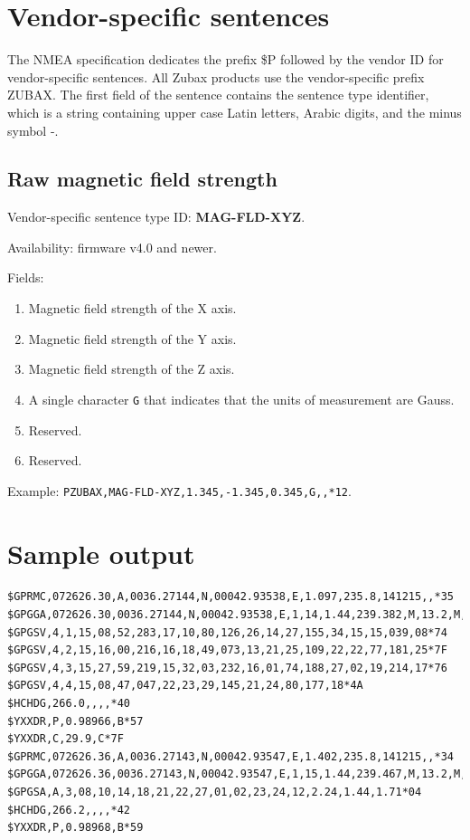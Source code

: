 \documentclass{zubaxdoc}
\begin{document}
\section{Vendor-specific sentences}

The NMEA specification dedicates the prefix {\$}P followed by the vendor ID for vendor-specific sentences. All Zubax products use the vendor-specific prefix ZUBAX. The first field of the sentence contains the sentence type identifier, which is a string containing upper case Latin letters, Arabic digits, and the minus symbol -.

\subsection{Raw magnetic field strength}

Vendor-specific sentence type ID: \textbf{MAG-FLD-XYZ}.

Availability: firmware v4.0 and newer.

Fields:

\begin{enumerate}
\item Magnetic field strength of the X axis.
\item Magnetic field strength of the Y axis.
\item Magnetic field strength of the Z axis.
\item A single character \texttt{G} that indicates that the units of measurement are Gauss.
\item Reserved.
\item Reserved.
\end{enumerate}

Example: \verb|PZUBAX,MAG-FLD-XYZ,1.345,-1.345,0.345,G,,*12|.

\section{Sample output}

\begin{verbatim}
$GPRMC,072626.30,A,0036.27144,N,00042.93538,E,1.097,235.8,141215,,*35
$GPGGA,072626.30,0036.27144,N,00042.93538,E,1,14,1.44,239.382,M,13.2,M,,*5E
$GPGSV,4,1,15,08,52,283,17,10,80,126,26,14,27,155,34,15,15,039,08*74
$GPGSV,4,2,15,16,00,216,16,18,49,073,13,21,25,109,22,22,77,181,25*7F
$GPGSV,4,3,15,27,59,219,15,32,03,232,16,01,74,188,27,02,19,214,17*76
$GPGSV,4,4,15,08,47,047,22,23,29,145,21,24,80,177,18*4A
$HCHDG,266.0,,,,*40
$YXXDR,P,0.98966,B*57
$YXXDR,C,29.9,C*7F
$GPRMC,072626.36,A,0036.27143,N,00042.93547,E,1.402,235.8,141215,,*34
$GPGGA,072626.36,0036.27143,N,00042.93547,E,1,15,1.44,239.467,M,13.2,M,,*5A
$GPGSA,A,3,08,10,14,18,21,22,27,01,02,23,24,12,2.24,1.44,1.71*04
$HCHDG,266.2,,,,*42
$YXXDR,P,0.98968,B*59
\end{verbatim}
\end{document}
